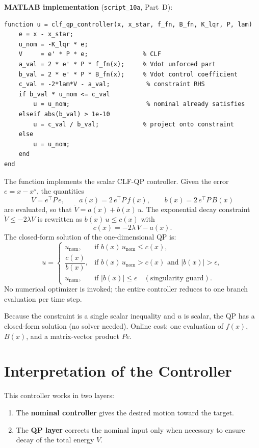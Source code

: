 \documentclass[11pt,a4paper]{article}
\begin{document}
\noindent\textbf{MATLAB implementation} (\texttt{script\_10a}, Part~D):

\begin{lstlisting}
function u = clf_qp_controller(x, x_star, f_fn, B_fn, K_lqr, P, lam)
    e = x - x_star;
    u_nom = -K_lqr * e;
    V     = e' * P * e;               % CLF
    a_val = 2 * e' * P * f_fn(x);     % Vdot unforced part
    b_val = 2 * e' * P * B_fn(x);     % Vdot control coefficient
    c_val = -2*lam*V - a_val;          % constraint RHS
    if b_val * u_nom <= c_val
        u = u_nom;                     % nominal already satisfies
    elseif abs(b_val) > 1e-10
        u = c_val / b_val;            % project onto constraint
    else
        u = u_nom;
    end
end
\end{lstlisting}

\begin{codemath}
The function implements the scalar CLF-QP controller. Given the error \(e = x - x^\star\), the quantities
\[
V = e^\top P\, e, \qquad
a(x) = 2\,e^\top P\, f(x), \qquad
b(x) = 2\,e^\top P\, B(x)
\]
are evaluated, so that \(\dot V = a(x) + b(x)\,u\). The exponential decay constraint \(\dot V \le -2\lambda V\) is rewritten as \(b(x)\,u \le c(x)\) with
\[
c(x) = -2\lambda\, V - a(x).
\]
The closed-form solution of the one-dimensional QP is:
\[
u =
\begin{cases}
u_{\mathrm{nom}}, & \text{if } b(x)\,u_{\mathrm{nom}} \le c(x), \\[1ex]
\dfrac{c(x)}{b(x)}, & \text{if } b(x)\,u_{\mathrm{nom}} > c(x) \text{ and } |b(x)| > \epsilon, \\[1.5ex]
u_{\mathrm{nom}}, & \text{if } |b(x)| \le \epsilon \quad (\text{singularity guard}).
\end{cases}
\]
No numerical optimizer is invoked; the entire controller reduces to one branch evaluation per time step.
\end{codemath}

Because the constraint is a single scalar inequality and \(u\) is scalar, the QP has a closed-form solution (no solver needed).  Online cost: one evaluation of \(f(x)\), \(B(x)\), and a matrix-vector product \(Pe\).

\section{Interpretation of the Controller}

This controller works in two layers:

\begin{enumerate}[leftmargin=2em]
    \item The \textbf{nominal controller} gives the desired motion toward the target.
    \item The \textbf{QP layer} corrects the nominal input only when necessary to ensure decay of the total energy \(V\).
\end{enumerate}
\end{document}
